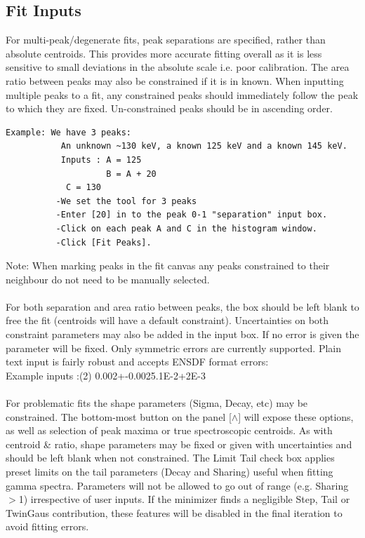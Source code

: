 \documentclass[a4paper,10pt]{article}
\begin{document}
\subsection{Fit Inputs}
For multi-peak/degenerate fits, peak separations are specified, rather than absolute centroids. This provides more accurate fitting overall as it is less sensitive to small deviations in the absolute scale i.e. poor calibration. The area ratio between peaks may also be constrained if it is in known. When inputting multiple peaks to a fit, any constrained peaks should immediately follow the peak to which they are fixed. Un-constrained peaks should be in ascending order.
\begin{lstlisting}
Example: We have 3 peaks:
           An unknown ~130 keV, a known 125 keV and a known 145 keV.
           Inputs : A = 125
                    B = A + 20
		    C = 130
          -We set the tool for 3 peaks
          -Enter [20] in to the peak 0-1 "separation" input box.
          -Click on each peak A and C in the histogram window.
          -Click [Fit Peaks].
\end{lstlisting}
Note: When marking peaks in the fit canvas any peaks constrained to their neighbour do not need to be manually selected.
\\
\\
For both separation and area ratio between peaks, the box should be left blank to free the fit (centroids will have a default constraint). Uncertainties on both constraint parameters may also be added in the input box. If no error is given the parameter will be fixed. Only symmetric errors are currently supported. Plain text input is fairly robust and accepts ENSDF format errors:\\
Example inputs :(2) 0.002+-0.002\qquad5.1E-2+2E-3
\label{sec:errors}
\\
\\
For problematic fits the shape parameters (Sigma, Decay, etc) may be constrained. The bottom-most button on the panel [$\wedge$] will expose these options, as well as selection of peak maxima or true spectroscopic centroids. As with centroid \& ratio, shape parameters may be fixed or given with uncertainties and should be left blank when not constrained. The Limit Tail check box applies preset limits on the tail parameters (Decay and Sharing) useful when fitting gamma spectra. 
Parameters will not be allowed to go out of range (e.g. Sharing $>$1) irrespective of user inputs. If the minimizer finds a negligible Step, Tail or TwinGaus contribution, these features will be disabled in the final iteration to avoid fitting errors.
\end{document}
